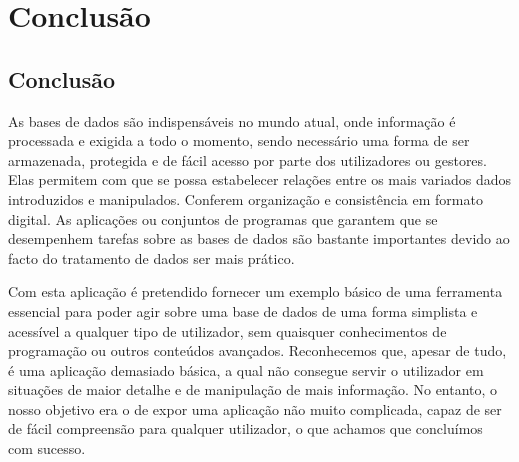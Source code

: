 \documentclass[11pt,openany,twoside]{report}
\begin{document}
\part{Conclusão}

\chapter{Conclusão}

As bases de dados são indispensáveis no mundo atual, onde informação é processada e exigida a todo o momento, sendo necessário uma forma de ser armazenada, protegida e de fácil acesso por parte dos utilizadores ou gestores. Elas permitem com que se possa estabelecer relações entre os mais variados dados introduzidos e manipulados. Conferem organização e consistência em formato digital. As aplicações ou conjuntos de programas que garantem que se desempenhem tarefas sobre as bases de dados são bastante importantes devido ao facto do tratamento de dados ser mais prático.

Com esta aplicação é pretendido fornecer um exemplo básico de uma ferramenta essencial para poder agir sobre uma base de dados de uma forma simplista e acessível a qualquer tipo de utilizador, sem quaisquer conhecimentos de programação ou outros conteúdos avançados. Reconhecemos que, apesar de tudo, é uma aplicação demasiado básica, a qual não consegue servir o utilizador em situações de maior detalhe e de manipulação de mais informação. No entanto, o nosso objetivo era o de expor uma aplicação não muito complicada, capaz de ser de fácil compreensão para qualquer utilizador, o que achamos que concluímos com sucesso.
\end{document}
